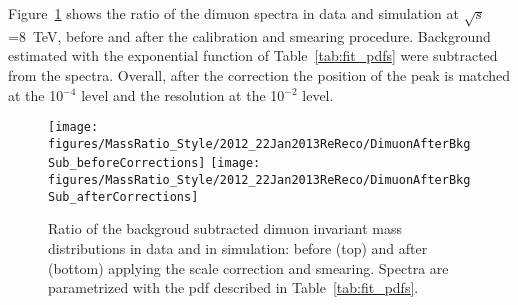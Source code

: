Figure~\ref{fig:MassRatio_8TeV} shows the ratio of the dimuon spectra
in data and simulation at $\sqrt{s}$=8~TeV, before and after the calibration and smearing
procedure. Background estimated with the exponential function of
Table~\ref{tab:fit_pdfs} were subtracted from the spectra. Overall, after the
correction the position of the peak is matched at the 10$^{-4}$ level
and the resolution at the 10$^{-2}$ level.
\begin{figure}[hbtp]  
\begin{center}
\texttt{[image: figures/MassRatio\_Style/2012\_22Jan2013ReReco/DimuonAfterBkgSub\_beforeCorrections]} 
\texttt{[image: figures/MassRatio\_Style/2012\_22Jan2013ReReco/DimuonAfterBkgSub\_afterCorrections]}
 \hspace{1cm} 
   \caption{Ratio of the backgroud subtracted dimuon
     invariant mass distributions in data and in simulation: before (top) and after
     (bottom) applying the scale correction and smearing.
     Spectra are parametrized with the pdf described in Table~\ref{tab:fit_pdfs}.
   \label{fig:MassRatio_8TeV}}
 \end{center}
\end{figure} 


